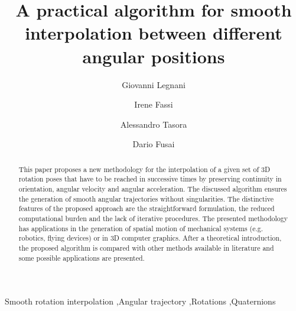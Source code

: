\documentclass[preprint, 12pt]{elsarticle}
\begin{document}

\begin{frontmatter}

\title{A practical algorithm for smooth interpolation between different angular positions}

\author[1,2,*]{Giovanni Legnani}
\author[2]{Irene Fassi}
\author[3]{Alessandro Tasora}
\author[3]{Dario Fusai}
\address[*]{corresponding author, giovanni.legnani@unibs.it}
\address[1]{DIMI-UniBS Dipartimento Ingegneria Meccanica e Industriale, Università di Brescia, Via Branze 38, 25123 Brescia, Italy}
\address[2]{STIIMA-CNR Istituto di Sistemi e Tecnologie Industriali per il Manifatturiero Avanzato, National Research Council, Via Alfonso Corti 12, 20133 Milano, Italy}
\address[3]{Dipartimento di Ingegneria e Architettura, Università di Parma, Parco Area delle Scienze, 181/A - 43124 PARMA, Italy}

\begin{abstract}
This paper proposes a new methodology for the interpolation of a given set of 3D rotation poses that have to be reached in successive times by preserving continuity in orientation, angular velocity and angular acceleration. The discussed algorithm ensures the generation of smooth angular trajectories without singularities. The distinctive features of the proposed approach are the straightforward formulation, the reduced computational burden and the lack of iterative procedures. The presented methodology has applications in the generation of spatial motion of mechanical systems (e.g. robotics, flying devices) or in 3D computer graphics. After a theoretical introduction, the proposed algorithm is compared with other methods available in literature and some possible applications are presented.
\end{abstract}

\begin{keyword}
Smooth rotation interpolation \sep Angular trajectory \sep Rotations \sep Quaternions
\end{keyword}

\end{frontmatter}

 


% 
% 

\end{document}

